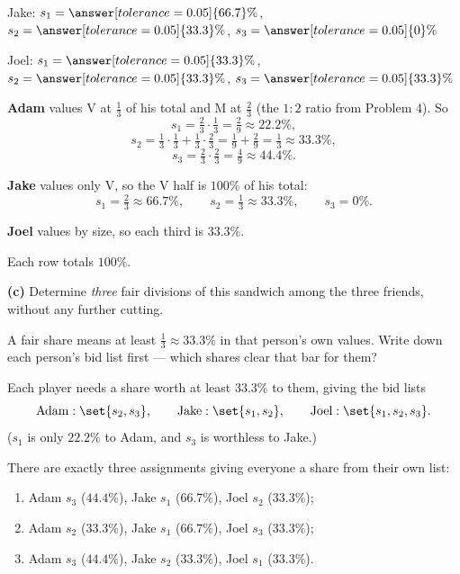\documentclass[12pt]{ximera}
\begin{document}
\begin{problem}
\begin{prompt}
\smallskip
Jake: $s_1 = \answer[tolerance=0.05]{66.7}\%$, \quad
$s_2 = \answer[tolerance=0.05]{33.3}\%$, \quad
$s_3 = \answer[tolerance=0.05]{0}\%$

\smallskip
Joel: $s_1 = \answer[tolerance=0.05]{33.3}\%$, \quad
$s_2 = \answer[tolerance=0.05]{33.3}\%$, \quad
$s_3 = \answer[tolerance=0.05]{33.3}\%$

\begin{solution}
\textbf{Adam} values V at $\frac13$ of his total and M at $\frac23$ (the $1:2$ ratio
from Problem 4). So
\[
s_1 = \tfrac23\cdot\tfrac13 = \tfrac29 \approx 22.2\%,
\]
\[
s_2 = \tfrac13\cdot\tfrac13 + \tfrac13\cdot\tfrac23 = \tfrac19+\tfrac29 = \tfrac13 \approx 33.3\%,
\]
\[
s_3 = \tfrac23\cdot\tfrac23 = \tfrac49 \approx 44.4\%.
\]

\textbf{Jake} values only V, so the V half is $100\%$ of his total:
\[ s_1 = \tfrac23 \approx 66.7\%, \qquad s_2 = \tfrac13 \approx 33.3\%, \qquad s_3 = 0\%. \]

\textbf{Joel} values by size, so each third is $33.3\%$.

Each row totals $100\%$. \checkmark
\end{solution}
\end{prompt}

\begin{prompt}
\textbf{(c)} Determine \emph{three} fair divisions of this sandwich among the three
friends, without any further cutting.

\begin{freeResponse}
\end{freeResponse}

\begin{hint}
A fair share means at least $\frac13 \approx 33.3\%$ in that person's own values.
Write down each person's bid list first --- which shares clear that bar for them?
\end{hint}

\begin{solution}
Each player needs a share worth at least $33.3\%$ to them, giving the bid lists
\[
\text{Adam}: \set{s_2, s_3}, \qquad \text{Jake}: \set{s_1, s_2}, \qquad
\text{Joel}: \set{s_1, s_2, s_3}.
\]
($s_1$ is only $22.2\%$ to Adam, and $s_3$ is worthless to Jake.)

There are exactly three assignments giving everyone a share from their own list:
\begin{enumerate}
\item Adam $s_3$ ($44.4\%$), Jake $s_1$ ($66.7\%$), Joel $s_2$ ($33.3\%$);
\item Adam $s_2$ ($33.3\%$), Jake $s_1$ ($66.7\%$), Joel $s_3$ ($33.3\%$);
\item Adam $s_3$ ($44.4\%$), Jake $s_2$ ($33.3\%$), Joel $s_1$ ($33.3\%$).
\end{enumerate}


\end{solution}
\end{prompt}
\end{problem}
\end{document}
